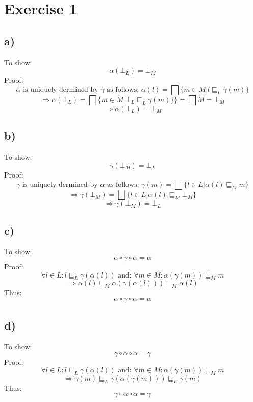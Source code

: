 \documentclass[fleqn,12pt]{article}
\begin{document}
\section*{Exercise 1}
\subsection*{a)}
To show:
$$\alpha(\bot_L) = \bot_M$$
Proof:
$$\alpha \text{ is uniquely dermined by $\gamma$ as follows: } \alpha(l) = \bigsqcap \{m \in M | l \sqsubseteq_L \gamma(m)\}$$
$$\Rightarrow  \alpha(\bot_L) = \bigsqcap \{m \in M | \bot_L \sqsubseteq_L \gamma(m) \}\} = \bigsqcap M = \bot_M$$
$$\Rightarrow \alpha(\bot_L) = \bot_M$$

\subsection*{b)}
To show:
$$\gamma(\bot_M) = \bot_L$$
Proof:
$$\gamma \text{ is uniquely dermined by $\alpha$ as follows: } \gamma(m) = \bigsqcup \{l \in L | \alpha(l) \sqsubseteq_M m\}$$
$$\Rightarrow \gamma(\bot_M) = \bigsqcup \{l \in L | \alpha(l) \sqsubseteq_M \bot_M\}$$
$$\Rightarrow \gamma(\bot_M) = \bot_L$$

\subsection*{c)}
To show:
$$\alpha \circ \gamma \circ \alpha = \alpha$$
Proof:
$$\forall l \in L: l \sqsubseteq_{L} \gamma(\alpha(l)) \text{ and: } \forall m \in M: \alpha(\gamma(m)) \sqsubseteq_{M} m$$
$$\Rightarrow \alpha(l) \sqsubseteq_M \alpha(\gamma(\alpha(l))) \sqsubseteq_M \alpha(l)$$
Thus:
$$\alpha \circ \gamma \circ \alpha = \alpha$$
\subsection*{d)}
To show:
$$\gamma \circ \alpha \circ \alpha = \gamma$$
Proof:
$$\forall l \in L: l \sqsubseteq_{L} \gamma(\alpha(l)) \text{ and: } \forall m \in M: \alpha(\gamma(m)) \sqsubseteq_{M} m$$
$$\Rightarrow \gamma(m) \sqsubseteq_L \gamma(\alpha(\gamma(m))) \sqsubseteq_L \gamma(m)$$
Thus:
$$\gamma \circ \alpha \circ \alpha = \gamma$$
\end{document}
